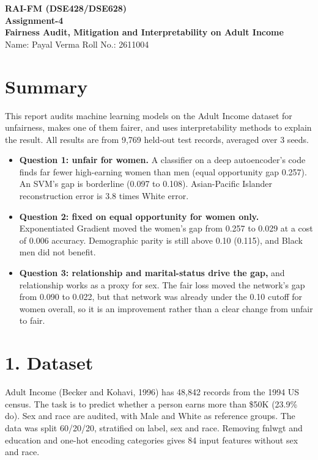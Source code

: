 \documentclass[10pt,a4paper]{article}
\begin{document}
\thispagestyle{fancy}
\begin{center}
{\bfseries RAI-FM (DSE428/DSE628)}\\ {\bfseries Assignment-4}\\[4pt]
{\Large\bfseries Fairness Audit, Mitigation and Interpretability on Adult Income}\\[4pt]
Name: Payal Verma \qquad Roll No.: 2611004
\end{center}

\section*{Summary}

This report audits machine learning models on the Adult Income dataset for unfairness, makes one of them fairer, and uses interpretability methods to explain the result. All results are from 9,769 held-out test records, averaged over 3 seeds.

\begin{itemize}
  \item \textbf{Question 1: unfair for women.} A classifier on a deep autoencoder's code finds far fewer high-earning women than men (equal opportunity gap \textminus{}0.257). An SVM's gap is borderline (\textminus{}0.097 to \textminus{}0.108). Asian-Pacific Islander reconstruction error is 3.8 times White error.
  \item \textbf{Question 2: fixed on equal opportunity for women only.} Exponentiated Gradient moved the women's gap from \textminus{}0.257 to 0.029 at a cost of 0.006 accuracy. Demographic parity is still above 0.10 (\textminus{}0.115), and Black men did not benefit.
  \item \textbf{Question 3: relationship and marital-status drive the gap,} and relationship works as a proxy for sex. The fair loss moved the network's gap from \textminus{}0.090 to 0.022, but that network was already under the 0.10 cutoff for women overall, so it is an improvement rather than a clear change from unfair to fair.
\end{itemize}

\section*{1. Dataset}

Adult Income (Becker and Kohavi, 1996) has 48,842 records from the 1994 US census. The task is to predict whether a person earns more than \$50K (23.9\% do). Sex and race are audited, with Male and White as reference groups. The data was split 60/20/20, stratified on label, sex and race. Removing fnlwgt and education and one-hot encoding categories gives 84 input features without sex and race.
\end{document}
